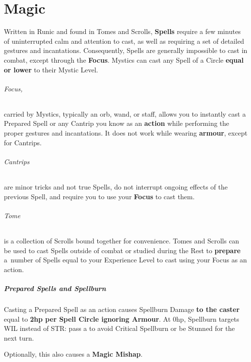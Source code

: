 \documentclass[itdr/core]{subfiles}
\begin{document}
\chapter{Magic}
\label{ch:magic}

Written in Runic and found in Tomes and Scrolls, \textbf{Spells} require a few minutes of uninterrupted calm and attention to cast, as well as requiring a set of detailed gestures and incantations. Consequently, Spells are generally impossible to cast in combat, except through the \textbf{Focus}. Mystics can cast any Spell of a Circle \textbf{equal or lower} to their Mystic Level.\tight


\subparagraph{Focus,} carried by Mystics, typically an orb, wand, or staff, allows you to instantly cast a Prepared Spell or any Cantrip you know as an \textbf{action} while performing the proper gestures and incantations. It does not work while wearing \textbf{armour}, \mbox{except} for Cantrips.


\subparagraph{Cantrips} are minor tricks and not true Spells, do not interrupt ongoing effects of the previous Spell, and require you to use your \textbf{Focus} to cast them.


\subparagraph{Tome} is a collection of Scrolls bound together for convenience. Tomes and Scrolls can be used to cast Spells outside of combat or studied during the Rest to \textbf{prepare} a~number of Spells equal to your Experience Level to cast using your Focus as an action.


\paragraph{Prepared Spells and Spellburn}

Casting a Prepared Spell as an action causes \mbox{Spellburn} \mbox{Damage} \textbf{to the caster} equal to \textbf{2hp per Spell Circle ignoring Armour}. At 0hp, Spellburn targets WIL \mbox{instead} of STR: pass a  to avoid Critical Spellburn or be Stunned for the next turn.

\vspace{-0.5ex}
\begin{dbox}
	Optionally, this also causes a \textbf{Magic Mishap}.\footnotemark[1]
\end{dbox}
\vspace{-0.5ex}
\end{document}
